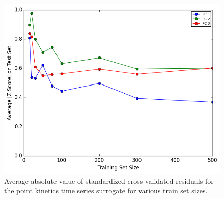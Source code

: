 \begin{figure}[!h]
\caption{\label{fig:pk_average_zscore}
Average absolute value of standardized cross-validated residuals for the point kinetics time series surrogate for various train set sizes.}
 \begin{center}
  \includegraphics[scale=.7]{./Chapter4/pk_average_zscore.png}
 \end{center}
\end{figure}
 
  
